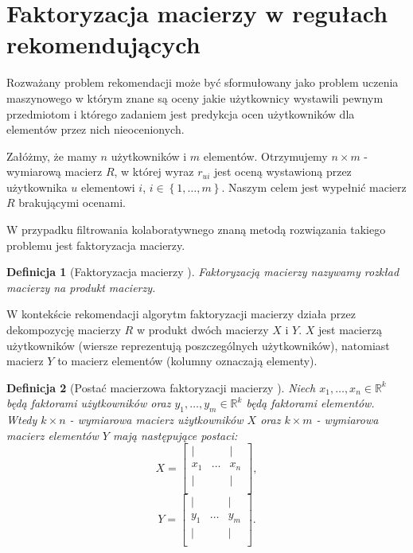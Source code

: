 \documentclass[12pt,a4paper]{report}
\newtheorem{df}{Definicja}[chapter]
\newcommand{\set}[1]{\left\lbrace {#1} \right\rbrace}
\newcommand{\setR}{\mathbb{R}}
\begin{document}
\section{Faktoryzacja macierzy w regułach rekomendujących}
Rozważany problem rekomendacji może być sformułowany jako problem uczenia maszynowego w którym znane są oceny jakie użytkownicy wystawili pewnym przedmiotom i którego zadaniem jest predykcja ocen użytkowników dla elementów przez nich nieocenionych. 

Załóżmy, że mamy $n$ użytkowników i $m$ elementów. Otrzymujemy $n \times m$ - wymiarową macierz $R$, w której wyraz $r_{ui}$ jest oceną wystawioną przez użytkownika $u$ elementowi $i$, $i \in \set{1, \ldots, m}$. Naszym celem jest wypełnić macierz $R$ brakującymi ocenami. 

W przypadku filtrowania kolaboratywnego znaną metodą rozwiązania takiego problemu jest faktoryzacja macierzy.

\begin{df}[Faktoryzacja macierzy {\citep{mcvals}}]
Faktoryzacją macierzy nazywamy rozkład macierzy na produkt macierzy.  
\end{df}

W kontekście rekomendacji algorytm faktoryzacji macierzy działa przez dekompozycję macierzy $R$ w produkt dwóch  macierzy $X$ i $Y$. $X$ jest macierzą użytkowników (wiersze reprezentują poszczególnych użytkowników), natomiast macierz $Y$ to macierz elementów (kolumny oznaczają elementy).

\begin{df}[Postać macierzowa faktoryzacji macierzy {\citep{mcvals}}]
Niech $x_1, \ldots , x_n \in \setR ^k$ będą faktorami użytkowników oraz $y_1, \ldots, y_m \in \setR^k$ będą faktorami elementów. Wtedy $k \times n$ - wymiarowa macierz użytkowników $X$ oraz $k \times m$ - wymiarowa macierz elementów $Y$ mają następujące postaci:
$$
X = \left[
        \begin{array}{ccc}
         | & & | \\
         x_1 & \ldots & x_n \\
         | & & | \\
         \end{array}
      \right],
$$
$$
Y = \left[
        \begin{array}{ccc}
         | & & | \\
         y_1 & \ldots & y_m \\
         | & & | \\
         \end{array}
      \right].
$$      
\end{df}
\end{document}
